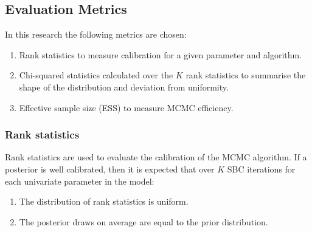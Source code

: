 \documentclass[12pt, a4paper]{article}
\begin{document}
        

    \subsection{Evaluation Metrics}
        In this research the following metrics are chosen:

        \begin{enumerate}
            \item Rank statistics to measure calibration for a given parameter and algorithm.
            
            \item Chi-squared statistics calculated over the $K$ rank statistics to summarise the shape of the distribution and deviation from uniformity.

            \item Effective sample size (ESS) to measure MCMC efficiency.
        \end{enumerate}

        \subsubsection{Rank statistics}
            Rank statistics are used to evaluate the calibration of the MCMC algorithm. If a posterior is well calibrated, then it is expected that over $K$ SBC iterations for each univariate parameter in the model:

            \begin{enumerate}
                \item The distribution of rank statistics is uniform.
                \item The posterior draws on average are equal to the prior distribution.
            \end{enumerate}
\end{document}
